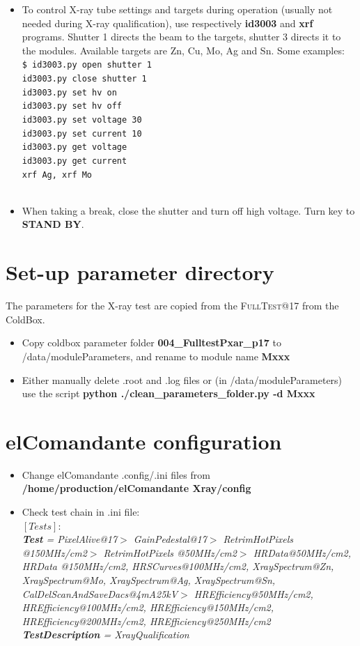 \documentclass[fleqn,10pt]{SelfArx} %
\newcommand{\shellcmd}[1]{\\\indent\indent\texttt{\footnotesize\$ #1}\\}
\newcommand{\testname}[1]{{\color{Darkcyan} \textsc{#1}}}
\begin{document}
\begin{itemize}
\item {To control X-ray tube settings and targets during operation (usually not needed during X-ray qualification), use respectively \textbf{id3003} and \textbf{xrf} programs. Shutter 1 directs the beam to the targets, shutter 3 directs it to the modules. Available targets are Zn, Cu, Mo, Ag and Sn. Some examples:
\shellcmd{
id3003.py open shutter 1\\
id3003.py close shutter 1\\
id3003.py set hv on\\
id3003.py set hv off\\
id3003.py set voltage 30\\
id3003.py set current 10\\
id3003.py get voltage\\
id3003.py get current\\
xrf Ag, xrf Mo\\
}
}
\item{When taking a break, close the shutter and turn off high voltage. Turn key to \textbf{STAND BY}.}
\end{itemize}


\section{Set-up parameter directory}

The parameters for the X-ray test are copied from the \testname{FullTest}@17 from the ColdBox.

\begin{itemize}
\item Copy coldbox parameter folder \textbf{004\_FulltestPxar\_p17} to /data/moduleParameters, and rename to module name \textbf{Mxxx}
\item Either manually delete .root and .log files or (in /data/moduleParameters) use the script \textbf{python ./clean\_parameters\_folder.py -d Mxxx}
\end{itemize}

\section{elComandante configuration}

\begin{itemize}
\item Change elComandante .config/.ini files from \textbf{/home/production/elComandante{\color{Red} Xray}/config}
\item Check test chain in .ini file: \\
 $[Tests]$:\\
{\it {\bf Test} = PixelAlive@17$>$ GainPedestal@17$>$ RetrimHotPixels @150MHz/cm2$>$ RetrimHotPixels @50MHz/cm2$>$
HRData@50MHz/cm2, HRData @150MHz/cm2, HRSCurves@100MHz/cm2,
XraySpectrum@Zn, XraySpectrum@Mo, XraySpectrum@Ag, XraySpectrum@Sn,
CalDelScanAndSaveDacs@4mA25kV$>$ HREfficiency@50MHz/cm2,
HREfficiency@100MHz/cm2, HREfficiency@150MHz/cm2,
HREfficiency@200MHz/cm2, HREfficiency@250MHz/cm2\\
{\bf TestDescription} = XrayQualification}
\end{itemize}
\end{document}
